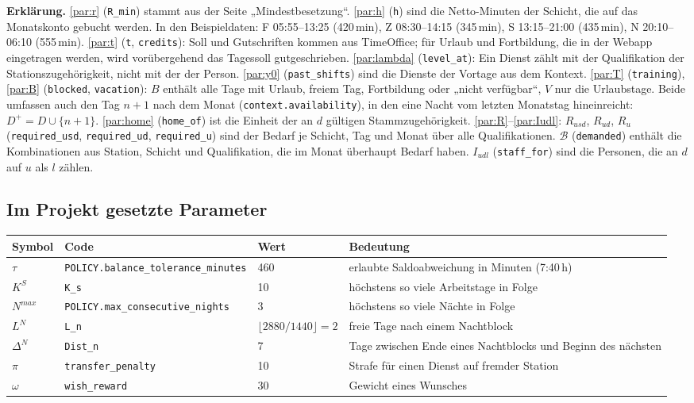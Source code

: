\documentclass[11pt]{combiArticle}
\newcommand{\code}[1]{\texttt{#1}}
\begin{document}
\textbf{Erklärung.}
\eqref{par:r} (\code{R\_min}) stammt aus der Seite „Mindestbesetzung“.
\eqref{par:h} (\code{h}) sind die Netto-Minuten der Schicht, die auf das Monatskonto gebucht werden. In den
Beispieldaten: F 05:55--13:25 (420\,min), Z 08:30--14:15 (345\,min), S 13:15--21:00 (435\,min),
N 20:10--06:10 (555\,min).
\eqref{par:t} (\code{t}, \code{credits}): Soll und Gutschriften kommen aus TimeOffice; für Urlaub und
Fortbildung, die in der Webapp eingetragen werden, wird vorübergehend das Tagessoll gutgeschrieben.
\eqref{par:lambda} (\code{level\_at}): Ein Dienst zählt mit der Qualifikation der Stationszugehörigkeit,
nicht mit der der Person.
\eqref{par:y0} (\code{past\_shifts}) sind die Dienste der Vortage aus dem Kontext.
\eqref{par:T} (\code{training}), \eqref{par:B} (\code{blocked}, \code{vacation}): $B$ enthält alle Tage
mit Urlaub, freiem Tag, Fortbildung oder „nicht verfügbar“, $V$ nur die Urlaubstage. Beide umfassen auch den
Tag $n+1$ nach dem Monat (\code{context.availability}), in den eine Nacht vom letzten Monatstag hineinreicht:
$D^{+} = D \cup \{n+1\}$.
\eqref{par:home} (\code{home\_of}) ist die Einheit der an $d$ gültigen Stammzugehörigkeit.
\eqref{par:R}--\eqref{par:Iudl}: $R_{usd}$, $R_{ud}$, $R_u$ (\code{required\_usd}, \code{required\_ud},
\code{required\_u}) sind der Bedarf je Schicht, Tag und Monat über alle Qualifikationen. $\mathcal{B}$
(\code{demanded}) enthält die Kombinationen aus Station, Schicht und Qualifikation, die im Monat überhaupt
Bedarf haben. $I_{udl}$ (\code{staff\_for}) sind die Personen, die an $d$ auf $u$ als $l$ zählen.

\subsection{Im Projekt gesetzte Parameter}

\begin{center}
\small
\begin{tabular}{l l l p{5.4cm}}
\hline
Symbol & Code & Wert & Bedeutung \\
\hline
$\tau$ & \code{POLICY.balance\_tolerance\_minutes} & 460 & erlaubte Saldoabweichung in Minuten (7:40\,h) \\
$K^{S}$ & \code{K\_s} & 10 & höchstens so viele Arbeitstage in Folge \\
$N^{max}$ & \code{POLICY.max\_consecutive\_nights} & 3 & höchstens so viele Nächte in Folge \\
$L^{N}$ & \code{L\_n} & $\lfloor 2880/1440 \rfloor = 2$ & freie Tage nach einem Nachtblock \\
$\Delta^{N}$ & \code{Dist\_n} & 7 & Tage zwischen Ende eines Nachtblocks und Beginn des nächsten \\
$\pi$ & \code{transfer\_penalty} & 10 & Strafe für einen Dienst auf fremder Station \\
$\omega$ & \code{wish\_reward} & 30 & Gewicht eines Wunsches \\
\hline
\end{tabular}
\end{center}
\end{document}
